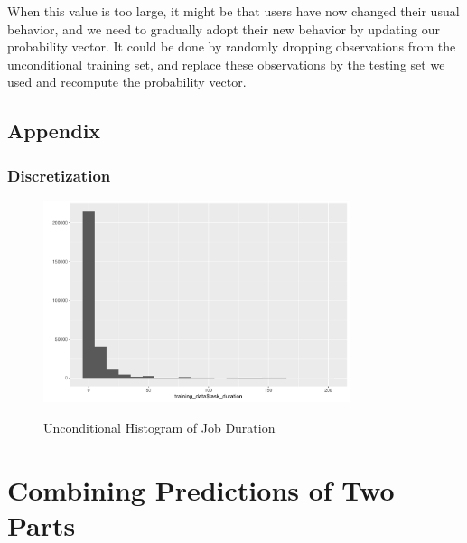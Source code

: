 \documentclass{article}
\begin{document}
\begin{flushleft}
When this value is too large, it might be that users have now changed their
usual behavior, and we need to gradually adopt their new behavior by updating
our probability vector. It could be done by randomly dropping observations from
the unconditional training set, and replace these observations by the testing
set we used and recompute the probability vector.
\end{flushleft}

\subsection{Appendix}

\subsubsection{Discretization}

\begin{figure}[htbp]
\caption{Unconditional Histogram of Job Duration}
\centering
\includegraphics[width = 0.8\textwidth]{uncondional_hist}
\label{fig:fig2.2.1}
\end{figure}

\section{Combining Predictions of Two Parts}
\end{document}
